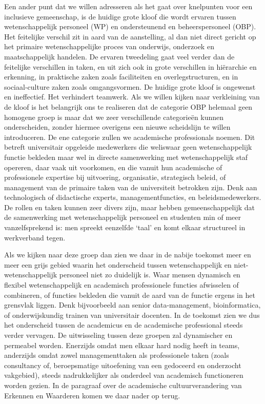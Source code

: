 \documentclass[smallauthor, chapterhaspagenum, nochapterinheader, pagenuminheader,  bigchapnum,medium2, tocpages, garamond, titleinheader]{jote-book}
\begin{document}
	\enlargethispage{-\baselineskip}\checkandfixthelayout

	Een ander punt dat we willen adresseren als het gaat over knelpunten voor een inclusieve gemeenschap, is de huidige grote kloof die wordt ervaren tussen wetenschappelijk personeel (WP) en ondersteunend en beheerspersoneel (OBP). Het feitelijke verschil zit in aard van de aanstelling, al dan niet direct gericht op het primaire wetenschappelijke proces van onderwijs, onderzoek en maatschappelijk handelen. De ervaren tweedeling gaat veel verder dan de feitelijke verschillen in taken, en uit zich ook in grote verschillen in hiërarchie en erkenning, in praktische zaken zoals faciliteiten en overlegstructuren, en in sociaal-culture zaken zoals omgangsvormen. De huidige grote kloof is ongewenst en ineffectief. Het verhindert teamwerk. Als we willen kijken naar verkleining van de kloof is het belangrijk ons te realiseren dat de categorie OBP helemaal geen homogene groep is maar dat we zeer verschillende categorieën kunnen onderscheiden, zonder hiermee overigens een nieuwe scheidslijn te willen introduceren. De ene categorie zullen we academische professionals noemen. Dit betreft universitair opgeleide medewerkers die weliswaar geen wetenschappelijk functie bekleden maar wel in directe samenwerking met wetenschappelijk staf opereren, daar vaak uit voorkomen, en die vanuit hun academische of professionele expertise bij uitvoering, organisatie, strategisch beleid, of management van de primaire taken van de universiteit betrokken zijn. Denk aan technologisch of didactische experts, managementfuncties, en beleidsmedewerkers. De rollen en taken kunnen zeer divers zijn, maar hebben gemeenschappelijk dat de samenwerking met wetenschappelijk personeel en studenten min of meer vanzelfsprekend is: men spreekt eenzelfde ‘taal' en komt elkaar structureel in werkverband tegen.



	Als we kijken naar deze groep dan zien we daar in de nabije toekomst meer en meer een grijs gebied waarin het onderscheid tussen wetenschappelijk en niet-wetenschappelijk personeel niet zo duidelijk is. Waar mensen dynamisch en flexibel wetenschappelijk en academisch professionele functies afwisselen of combineren, of functies bekleden die vanuit de aard van de functie ergens in het grensvlak liggen. Denk bijvoorbeeld aan senior data-management, bioinformatica, of onderwijskundig trainen van universitair docenten. In de toekomst zien we dus het onderscheid tussen de academicus en de academische professional steeds verder vervagen. De uitwisseling tussen deze groepen zal dynamischer en permeabel worden. Enerzijds omdat men elkaar hard nodig heeft in teams, anderzijds omdat zowel managementtaken als professionele taken (zoals consultancy of, beroepsmatige uitoefening van een gedoceerd en onderzocht vakgebied), steeds nadrukkelijker als onderdeel van academisch functioneren worden gezien. In de paragraaf over de academische cultuurverandering van Erkennen en Waarderen komen we daar nader op terug.
\end{document}
